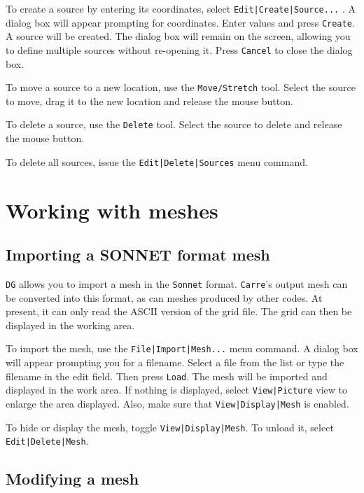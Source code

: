 \documentclass[a4paper,10pt]{report}
\begin{document}
To create a source by entering its coordinates, select
{\tt Edit|Create|Source...} . A dialog box will appear prompting for
coordinates. Enter values and press {\tt Create}. A source will be
created.  The dialog box will remain on the screen, allowing you to
define multiple sources without re-opening it. Press {\tt Cancel} to
close the dialog box.

To move a source to a new location, use the {\tt Move/Stretch} tool.
Select the source to move, drag it to the new location and release the
mouse button.

To delete a source, use the {\tt Delete} tool. Select the source to
delete and release the mouse button.

To delete all sources, issue the {\tt Edit|Delete|Sources} menu command.

\section{Working with meshes}

\subsection{Importing a SONNET format mesh}

{\tt DG} allows you to import a mesh in the {\tt Sonnet} format. {\tt Carre}'s output
mesh can be converted into this format, as can meshes produced by other
codes. At present, it
can only read the ASCII version of the grid file. The grid can then be
displayed in the working area.

To import the mesh, use the {\tt File|Import|Mesh...} menu
command. A dialog box will appear prompting you for a filename. Select
a file from the list or type the filename in the edit field. Then
press {\tt Load}.  The mesh will be imported and displayed in
the work area. If nothing is displayed, select {\tt View|Picture}
view to enlarge the area displayed. Also, make sure that
{\tt View|Display|Mesh} is enabled.

To hide or display the mesh, toggle {\tt View|Display|Mesh}.
To unload it, select {\tt Edit|Delete|Mesh}.

\subsection{Modifying a mesh}
\end{document}
